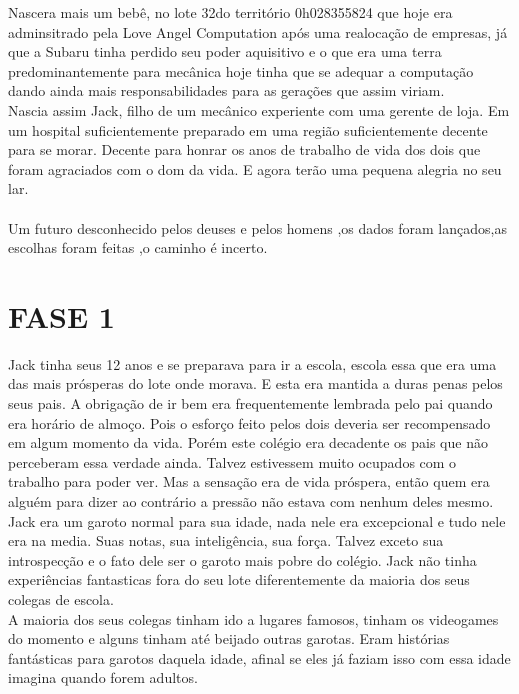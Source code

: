 \documentclass{book}
\begin{document}
Nascera mais um bebê, no lote 32do território 0h028355824 que hoje era adminsitrado pela Love Angel Computation após uma realocação de empresas, já que a Subaru tinha perdido seu poder aquisitivo e o que era uma terra predominantemente para mecânica hoje tinha que se adequar a computação dando ainda mais responsabilidades para as gerações que assim viriam. \\
Nascia assim Jack, filho de um mecânico experiente com uma gerente de loja. Em um hospital suficientemente preparado em uma região suficientemente decente para se morar. Decente para honrar os anos de trabalho de vida dos dois que foram agraciados com o dom da vida. E agora terão uma pequena alegria no seu lar. \\\\

Um futuro desconhecido pelos deuses e pelos homens ,os dados foram lançados,as escolhas foram feitas ,o caminho é incerto.\\

\section*{FASE 1}
 Jack tinha seus 12 anos e se preparava para ir a escola, escola essa que era uma das mais prósperas do lote onde morava. E esta era mantida a duras penas pelos seus pais. A obrigação de ir bem era frequentemente lembrada pelo pai quando era horário de almoço. Pois o esforço feito pelos dois deveria ser recompensado em algum momento da vida. Porém este colégio era decadente os pais que não perceberam essa verdade ainda. Talvez estivessem muito ocupados com o trabalho para poder ver. Mas a sensação era de vida próspera, então quem era alguém para dizer ao contrário a pressão não estava com nenhum deles mesmo.\\
 Jack era um garoto normal para sua idade, nada nele era excepcional e tudo nele era na media. Suas notas, sua inteligência, sua força. Talvez exceto sua introspecção e o fato dele ser o garoto mais pobre do colégio. Jack não tinha experiências fantasticas fora do seu lote diferentemente da maioria dos seus colegas de escola. \\
 
 A maioria dos seus colegas tinham ido a lugares famosos, tinham os videogames do momento e alguns tinham até beijado outras garotas. Eram histórias fantásticas para garotos daquela idade, afinal se eles já faziam isso com essa idade imagina quando forem adultos.\\
 
\end{document}
